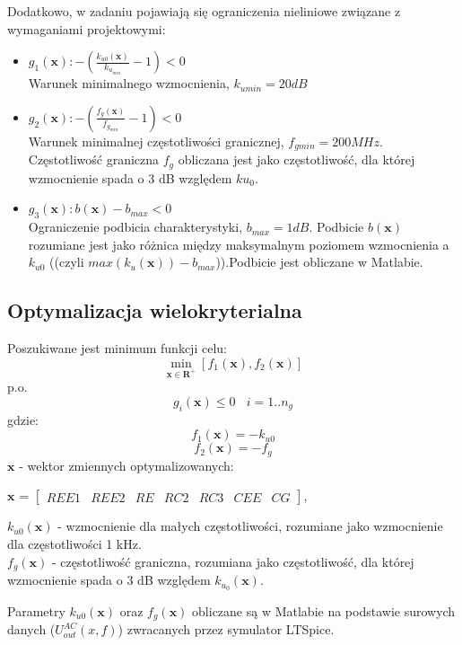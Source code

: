 \documentclass{article}
\begin{document}
Dodatkowo, w zadaniu pojawiają się ograniczenia nieliniowe związane z wymaganiami projektowymi:\\
\begin{itemize}
	\item \(g_1(\textbf{x}): -(\frac{k_{u0}(\textbf{x})}{k_{u_{min}}}-1) <  0\) \\ Warunek minimalnego wzmocnienia, $k_{umin}=20dB$
	\item \(g_2(\textbf{x}): -(\frac{{f_g}(\textbf{x})}{f_{g_{min}}}-1)<0\) \\ Warunek minimalnej częstotliwości granicznej, $f_{gmin}=200 MHz$. Częstotliwość graniczna $f_g$ obliczana jest jako częstotliwość,
dla której wzmocnienie spada o 3 dB względem $ku_0$.
	\item \(g_3(\textbf{x}): b(\textbf{x})-b_{max}<0\) \\ Ograniczenie podbicia charakterystyki, $b_{max}=1dB$. Podbicie $b(\textbf{x})$ rozumiane jest jako różnica między maksymalnym poziomem wzmocnienia a $k_{u0}$ ((czyli $max(k_{u}(\textbf{x}))-b_{max}$)).Podbicie jest obliczane w Matlabie.

\end{itemize}
\subsection{Optymalizacja wielokryterialna}
Poszukiwane jest minimum funkcji celu:
\[ \min\limits_{\textbf{x}\in \mathbf{R}^+  } [f_1(\textbf{x}), f_2(\textbf{x})] \]
p.o.
\[ g_{i}(\textbf{x}) \leq 0 \ \ \ \  i=1..n_g\]
gdzie:
\[ f_1(\textbf{x}) = -k_{u0}\] \[ f_2(\textbf{x}) = -f_g\]
\(\textbf{x}\) - wektor zmiennych optymalizowanych: \\
\begin{center}
	$\textbf{x}$ =
	$\begin{bmatrix}
			REE1 & REE2 & RE & RC2 & RC3 & CEE & CG
		\end{bmatrix}$,
\end{center}
\(k_{u0}(\textbf{x})\) - wzmocnienie dla małych częstotliwości, rozumiane jako wzmocnienie dla częstotliwości 1 kHz.\\
\(f_{g}(\textbf{x})\) - częstotliwość graniczna, rozumiana jako częstotliwość, dla której wzmocnienie
spada o 3 dB względem $k_{u_{0}}(\textbf{x}) $.

Parametry $k_{u0}(\textbf{x})$ oraz $f_g(\textbf{x})$ obliczane są w Matlabie na podstawie surowych danych ($U^{AC}_{out}(x,f)$) zwracanych
przez symulator LTSpice.
\end{document}

